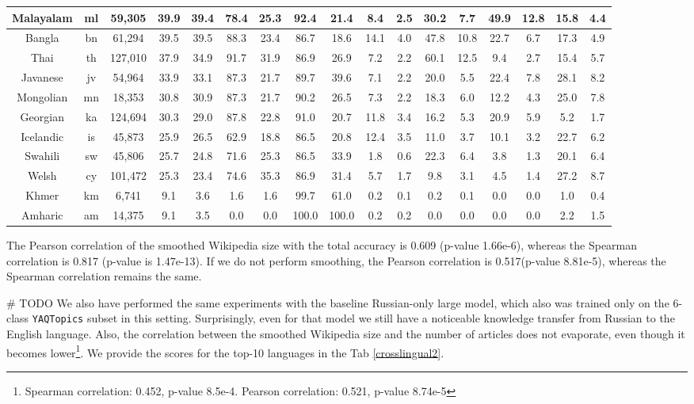\begin{table*}
{\begin{tabular}{|c|c|c||c|c|c|c|c|c|c|c|c|c|c|c|c|c|}
Malayalam & ml & 59,305 & 39.9 & 39.4 & 78.4 & 25.3 & 92.4 & 21.4 & 8.4 & 2.5 & 30.2 & 7.7 & 49.9 & 12.8 & 15.8 & 4.4\\ \hline
Bangla & bn & 61,294 & 39.5 & 39.5 & 88.3 & 23.4 & 86.7 & 18.6 & 14.1 & 4.0 & 47.8 & 10.8 & 22.7 & 6.7 & 17.3 & 4.9\\ \hline
Thai & th & 127,010 & 37.9 & 34.9 & 91.7 & 31.9 & 86.9 & 26.9 & 7.2 & 2.2 & 60.1 & 12.5 & 9.4 & 2.7 & 15.4 & 5.7\\ \hline
Javanese & jv & 54,964 & 33.9 & 33.1 & 87.3 & 21.7 & 89.7 & 39.6 & 7.1 & 2.2 & 20.0 & 5.5 & 22.4 & 7.8 & 28.1 & 8.2\\ \hline
Mongolian & mn & 18,353 & 30.8 & 30.9 & 87.3 & 21.7 & 90.2 & 26.5 & 7.3 & 2.2 & 18.3 & 6.0 & 12.2 & 4.3 & 25.0 & 7.8\\ \hline
Georgian & ka & 124,694 & 30.3 & 29.0 & 87.8 & 22.8 & 91.0 & 20.7 & 11.8 & 3.4 & 16.2 & 5.3 & 20.9 & 5.9 & 5.2 & 1.7\\ \hline
Icelandic & is & 45,873 & 25.9 & 26.5 & 62.9 & 18.8 & 86.5 & 20.8 & 12.4 & 3.5 & 11.0 & 3.7 & 10.1 & 3.2 & 22.7 & 6.2\\ \hline
Swahili & sw & 45,806 & 25.7 & 24.8 & 71.6 & 25.3 & 86.5 & 33.9 & 1.8 & 0.6 & 22.3 & 6.4 & 3.8 & 1.3 & 20.1 & 6.4\\ \hline
Welsh & cy & 101,472 & 25.3 & 23.4 & 74.6 & 35.3 & 86.9 & 31.4 & 5.7 & 1.7 & 9.8 & 3.1 & 4.5 & 1.4 & 27.2 & 8.7\\ \hline
Khmer & km & 6,741 & 9.1 & 3.6 & 1.6 & 1.6 & 99.7 & 61.0 & 0.2 & 0.1 & 0.2 & 0.1 & 0.0 & 0.0 & 1.0 & 0.4\\ \hline
Amharic & am & 14,375 & 9.1 & 3.5 & 0.0 & 0.0 & 100.0 & 100.0 & 0.2 & 0.2 & 0.0 & 0.0 & 0.0 & 0.0 & 2.2 & 1.5\\ \hline
\end{tabular}
}
\end{table*}
The Pearson correlation of the smoothed Wikipedia size with the total accuracy is 0.609 (p-value 1.66e-6), whereas the Spearman correlation is 0.817 (p-value is 1.47e-13). If we do not perform smoothing, the Pearson correlation is 0.517(p-value 8.81e-5), whereas the Spearman correlation remains the same.

\iffalse # TODO
We also have performed the same experiments with the baseline Russian-only large model, which also was trained only on the 6-class \texttt{YAQTopics} subset in this setting. Surprisingly, even for that model we still have a noticeable knowledge transfer from Russian to the English language. Also, the correlation between the smoothed Wikipedia size and the number of articles does not evaporate, even though it becomes lower\footnote{Spearman correlation: 0.452, p-value 8.5e-4. Pearson correlation: 0.521, p-value 8.74e-5}. We provide the scores for the top-10 languages in the Tab \ref{crosslingual2}.


